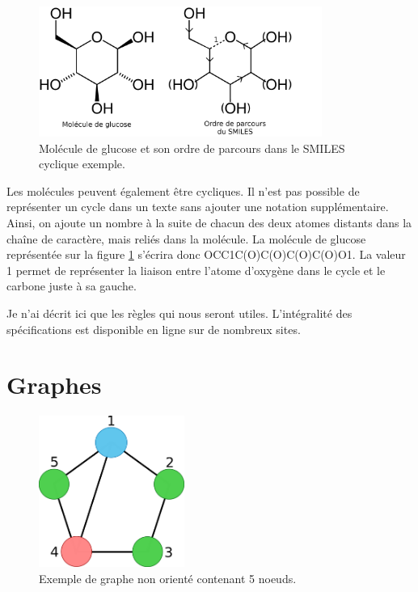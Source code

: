 \begin{figure}[h!]
  \begin{center}
    \includegraphics[width=350px]{Figures/Prerequis/glucose.png}
    \caption{\label{glucose}Molécule de glucose et son ordre de parcours dans le SMILES cyclique exemple.}
  \end{center}
\end{figure}

Les molécules peuvent également être cycliques.
Il n'est pas possible de représenter un cycle dans un texte sans ajouter une notation supplémentaire.
Ainsi, on ajoute un nombre à la suite de chacun des deux atomes distants dans la chaîne de caractère, mais reliés dans la molécule.
La molécule de glucose représentée sur la figure \ref{glucose} s'écrira donc OCC1C(O)C(O)C(O)C(O)O1.
La valeur 1 permet de représenter la liaison entre l'atome d'oxygène dans le cycle et le carbone juste à sa gauche.

Je n'ai décrit ici que les règles qui nous seront utiles.
L'intégralité des spécifications est disponible en ligne sur de nombreux sites.



\section{Graphes}
\label{graphes}

\begin{figure}[h!]
  \begin{center}
    \includegraphics[width=180px]{Figures/Prerequis/graphe.png}
    \caption{\label{graphe_def}Exemple de graphe non orienté contenant 5 noeuds.}
  \end{center}
\end{figure}

